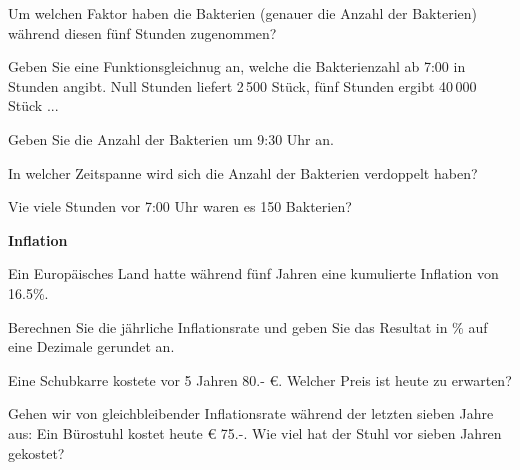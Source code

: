 \begin{bbwAufgabenBlock}

\item Um welchen Faktor haben die Bakterien (genauer die Anzahl der Bakterien) während diesen fünf
Stunden zugenommen?


\item Geben Sie eine Funktionsgleichnug an, welche die Bakterienzahl ab
7:00 in Stunden angibt. Null Stunden liefert 2\,500 Stück, fünf
      Stunden ergibt 40\,000 Stück ...

\item Geben Sie die Anzahl der Bakterien um 9:30 Uhr an.

\item In welcher Zeitspanne wird sich die Anzahl der Bakterien
verdoppelt haben?

\item Vie viele Stunden vor 7:00 Uhr waren es 150 Bakterien?


\end{bbwAufgabenBlock}
\platzFuerBerechnungenBisEndeSeite{}


\bbwActAufgabenNr{} \textbf{Inflation}

 Ein Europäisches Land hatte während fünf Jahren eine kumulierte
 Inflation von 16.5\%.
 
\begin{bbwAufgabenBlock}

\item Berechnen Sie die jährliche Inflationsrate und geben Sie das
  Resultat in \% auf eine Dezimale gerundet an.


    \item Eine Schubkarre kostete vor 5 Jahren 80.- \euro{}. Welcher
      Preis ist heute zu erwarten?

    \item Gehen wir von gleichbleibender Inflationsrate während der
      letzten sieben Jahre aus: Ein Bürostuhl kostet heute \euro{}
      75.-. Wie viel hat der Stuhl vor sieben Jahren gekostet?

      
\end{bbwAufgabenBlock}
\platzFuerBerechnungenBisEndeSeite{}

\newpage
